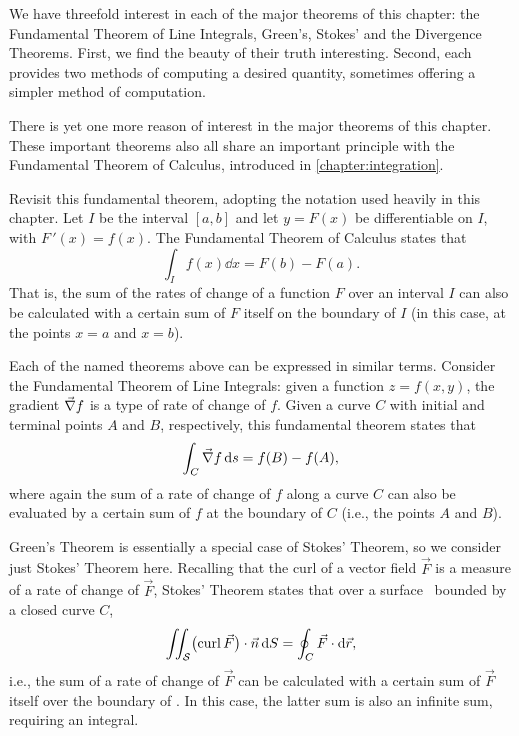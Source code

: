 We have threefold interest in each of the major theorems of this chapter: the Fundamental Theorem of Line Integrals, Green's, Stokes' and the Divergence Theorems. First, we find the beauty of their truth interesting. Second, each provides two methods of computing a desired quantity, sometimes offering a simpler method of computation. 


There is yet one more reason of interest in the major theorems of this chapter. %
These important theorems also all share an important principle with the Fundamental Theorem of Calculus, introduced in \autoref{chapter:integration}. 

Revisit this fundamental theorem, adopting the notation used heavily in this chapter. Let $I$ be the interval $[a,b]$ and let $y=F(x)$ be differentiable on $I$, with $F\,'(x) = f(x)$. The Fundamental Theorem of Calculus states that 
\[\int_I f(x)\dd x = F(b) - F(a).\]
That is, the sum of the rates of change of a function $F$ over an interval $I$ can also be calculated with a certain sum of $F$ itself on the boundary of $I$ (in this case, at the points $x=a$ and $x=b$).

Each of the named theorems above can be expressed in similar terms. Consider the Fundamental Theorem of Line Integrals: given a function $z=f(x,y)$, the gradient $\vec\nabla f$ is a type of rate of change of $f$. Given a curve $C$ with initial and terminal points $A$ and $B$, respectively, this fundamental theorem states that 
\[\int_C \vec\nabla f\operatorname{d}\! s = f(B) - f(A),\]
where again the sum of a rate of change of $f$ along a curve $C$ can also be evaluated by a certain sum of $f$ at the boundary of $C$ (i.e., the points $A$ and $B$).

Green's Theorem is essentially a special case of Stokes' Theorem, so we consider just Stokes' Theorem here. Recalling that the curl of a vector field $\vec F$ is a measure of a rate of change of $\vec F$, Stokes' Theorem states that over a surface \surfaceS\ bounded by a closed curve $C$,
\[
\iint_{\mathcal{S}} \bigl(\operatorname{curl} \vec F\bigr)\cdot \vec n\operatorname{d}\! S = \oint_C \vec F\cdot\operatorname{d}\!\vec r,
\]
i.e., the sum of a rate of change of $\vec F$ can be calculated with a certain sum of $\vec F$ itself over the boundary of \surfaceS. In this case, the latter sum is also an infinite sum, requiring an integral. 

